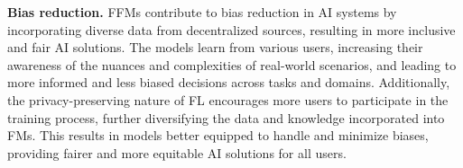 
\textbf{Bias reduction.}
FFMs contribute to bias reduction in AI systems by incorporating diverse data from decentralized sources, resulting in more inclusive and fair AI solutions. The models learn from various users, increasing their awareness of the nuances and complexities of real-world scenarios, and leading to more informed and less biased decisions across tasks and domains.
Additionally, the privacy-preserving nature of FL encourages more users to participate in the training process, further diversifying the data and knowledge incorporated into FMs. This results in models better equipped to handle and minimize biases, providing fairer and more equitable AI solutions for all users.

